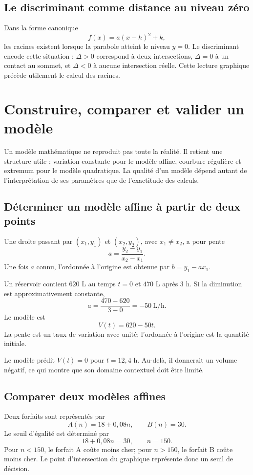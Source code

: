 \documentclass[12pt,a4paper,openany]{book}
\begin{document}
\subsection{Le discriminant comme distance au niveau zéro}
Dans la forme canonique
\[
f(x)=a(x-h)^2+k,
\]
les racines existent lorsque la parabole atteint le niveau $y=0$. Le discriminant encode cette situation : $\Delta>0$ correspond à deux intersections, $\Delta=0$ à un contact au sommet, et $\Delta<0$ à aucune intersection réelle. Cette lecture graphique précède utilement le calcul des racines.


\section{Construire, comparer et valider un modèle}

Un modèle mathématique ne reproduit pas toute la réalité. Il retient une structure utile : variation constante pour le modèle affine, courbure régulière et extremum pour le modèle quadratique. La qualité d'un modèle dépend autant de l'interprétation de ses paramètres que de l'exactitude des calculs.

\subsection{Déterminer un modèle affine à partir de deux points}

Une droite passant par $(x_1,y_1)$ et $(x_2,y_2)$, avec $x_1\neq x_2$, a pour pente
\[
a=\frac{y_2-y_1}{x_2-x_1}.
\]
Une fois $a$ connu, l'ordonnée à l'origine est obtenue par $b=y_1-ax_1$.

\begin{examplebox}
Un réservoir contient $620$ L au temps $t=0$ et $470$ L après $3$ h. Si la diminution est approximativement constante,
\[
a=\frac{470-620}{3-0}=-50\ \mathrm{L/h}.
\]
Le modèle est
\[
V(t)=620-50t.
\]
La pente est un taux de variation avec unité; l'ordonnée à l'origine est la quantité initiale.
\end{examplebox}

Le modèle prédit $V(t)=0$ pour $t=12{,}4$ h. Au-delà, il donnerait un volume négatif, ce qui montre que son domaine contextuel doit être limité.

\subsection{Comparer deux modèles affines}

Deux forfaits sont représentés par
\[
A(n)=18+0{,}08n,
\qquad
B(n)=30.
\]
Le seuil d'égalité est déterminé par
\[
18+0{,}08n=30,
\qquad n=150.
\]
Pour $n<150$, le forfait A coûte moins cher; pour $n>150$, le forfait B coûte moins cher. Le point d'intersection du graphique représente donc un seuil de décision.
\end{document}
